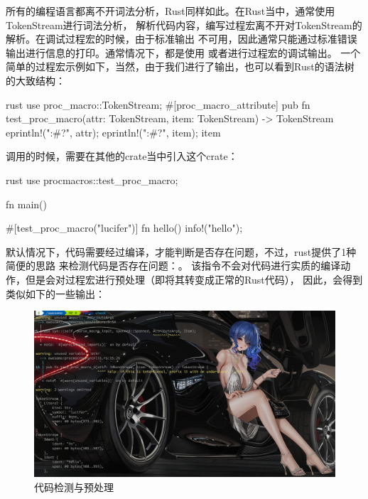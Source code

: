 所有的编程语言都离不开词法分析，Rust同样如此。在Rust当中，通常使用TokenStream进行词法分析，
解析代码内容，编写过程宏离不开对TokenStream的解析。在调试过程宏的时候，由于标准输出
不可用，因此通常只能通过标准错误输出进行信息的打印。通常情况下，都是使用
或者进行过程宏的调试输出。
一个简单的过程宏示例如下，当然，由于我们进行了输出，也可以看到Rust的语法树的大致结构：
\begin{code-block}{rust}
use proc_macro::TokenStream;
#[proc_macro_attribute]
pub fn test_proc_macro(attr: TokenStream, item: TokenStream) -> TokenStream {
    eprintln!("{:#?}", attr);
    eprintln!("{:#?}", item);
    item
}
\end{code-block}
调用的时候，需要在其他的crate当中引入这个crate：
\begin{code-block}{rust}
use procmacros::test_proc_macro;

fn main() {
}

#[test_proc_macro("lucifer")]
fn hello() {
    info!("hello");
}
\end{code-block}

默认情况下，代码需要经过编译，才能判断是否存在问题，不过，rust提供了1种简便的思路
来检测代码是否存在问题：。
该指令不会对代码进行实质的编译动作，但是会对过程宏进行预处理（即将其转变成正常的Rust代码），
因此，会得到类似如下的一些输出：
\begin{figure}[H]
  \centering
  \includegraphics[width=\linewidth]{rust_cargo_check.png}
  \caption{代码检测与预处理}
  \label{fig:rust_cargo_check}
\end{figure}

